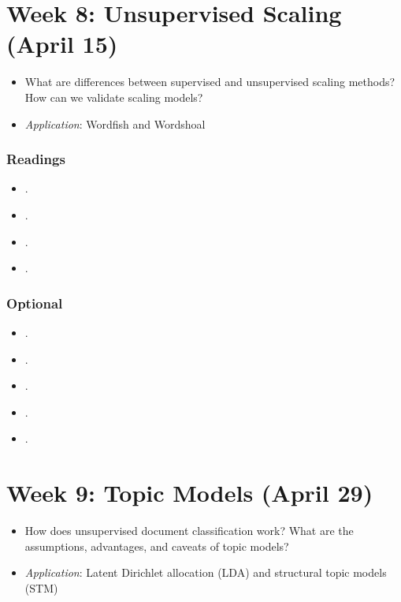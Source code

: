 \documentclass[abstract=on,parskip=full,headings=standardclasses,fontsize=11pt,paper=a4]{scrartcl}
\begin{document}
\section{Week 8: Unsupervised Scaling (April 15)}

\begin{itemize}
\renewcommand\labelitemi{--}
\item What are differences between supervised and unsupervised scaling methods? How can we validate scaling models?
\item \textit{Application}: Wordfish and Wordshoal
\end{itemize}

\subsubsection*{Readings}
\begin{itemize}
\item {}.
\item {}.
\item {}.
\item {}.
\end{itemize}

\subsubsection*{Optional}
\begin{itemize}
\item {}.
\item {}.
\item {}.
\item {}.
\item {}.
\end{itemize}


\section{Week 9: Topic Models (April 29)}

\begin{itemize}
\renewcommand\labelitemi{--}
\item How does unsupervised document classification work? What are the assumptions, advantages, and caveats of topic models? 
\item \textit{Application}: Latent Dirichlet allocation (LDA) and structural topic models (STM)
\end{itemize}
\end{document}
